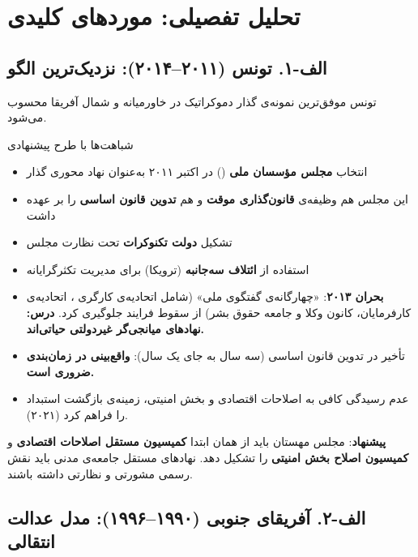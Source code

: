 \section{تحلیل تفصیلی: موردهای کلیدی}

\subsection{الف-۱. تونس (۲۰۱۱–۲۰۱۴): نزدیک‌ترین الگو}

تونس موفق‌ترین نمونه‌ی گذار دموکراتیک در خاورمیانه و شمال آفریقا محسوب می‌شود.

\begin{bandbox}{شباهت‌ها با طرح پیشنهادی}
\begin{itemize}
  \item انتخاب \textbf{مجلس مؤسسان ملی} () در اکتبر ۲۰۱۱ به‌عنوان نهاد محوری گذار
  \item این مجلس هم وظیفه‌ی \textbf{قانون‌گذاری موقت} و هم \textbf{تدوین قانون اساسی} را بر عهده داشت
  \item تشکیل \textbf{دولت تکنوکرات} تحت نظارت مجلس
  \item استفاده از \textbf{ائتلاف سه‌جانبه} (ترویکا) برای مدیریت تکثرگرایانه
\end{itemize}
\end{bandbox}

\begin{notebox}[title={\rl{دروس آموخته}}]
\begin{itemize}
  \item \textbf{بحران ۲۰۱۳}: «چهارگانه‌ی گفتگوی ملی» (شامل اتحادیه‌ی کارگری ، اتحادیه‌ی کارفرمایان، کانون وکلا و جامعه حقوق بشر) از سقوط فرایند جلوگیری کرد. \textbf{درس: نهادهای میانجی‌گر غیردولتی حیاتی‌اند.}
  \item تأخیر در تدوین قانون اساسی (سه سال به جای یک سال): \textbf{واقع‌بینی در زمان‌بندی ضروری است.}
  \item عدم رسیدگی کافی به اصلاحات اقتصادی و بخش امنیتی، زمینه‌ی بازگشت استبداد را فراهم کرد (۲۰۲۱).
\end{itemize}

\textbf{پیشنهاد}: مجلس مهستان باید از همان ابتدا \textbf{کمیسیون مستقل اصلاحات اقتصادی} و \textbf{کمیسیون اصلاح بخش امنیتی} را تشکیل دهد. نهادهای مستقل جامعه‌ی مدنی باید نقش رسمی مشورتی و نظارتی داشته باشند.
\end{notebox}

\subsection{الف-۲. آفریقای جنوبی (۱۹۹۰–۱۹۹۶): مدل عدالت انتقالی}

